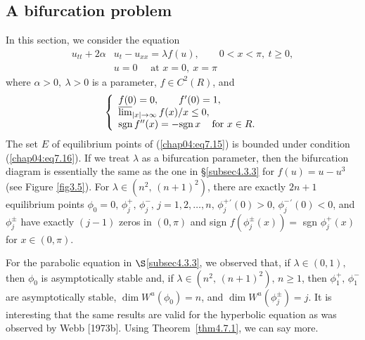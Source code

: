\documentclass{surv-l}
\theoremstyle{plain}
\theoremstyle{definition}
\numberwithin{equation}{section}
\numberwithin{figure}{chapter}
\begin{document}
\subsection{A bifurcation problem}\label{subsec4.7.2} In this section, we consider the equation
\begin{equation}\label{chap04:eq7.15}
\begin{split}
u_{tt}+2\alpha &u_{t}-u_{xx}=\lambda f(u),\qquad 0<x<\pi,\ t\geq 0,\\
&u=0\quad \text{ at } x=0,\ x=\pi
\end{split}
\end{equation}
where $\alpha >0,\ \lambda>0$ is a parameter, $f\in C^{2}(R)$, and
\begin{align}\label{chap04:eq7.16}
\left\{\begin{array}{l}
f(0)=0,\qquad f^{\prime}(0)=1,\\
\varlimsup_{|x|\rightarrow\infty}f(x)/x\leq 0,\\
\mathrm{sgn}\, f^{\prime\prime}(x)= -\mathrm{sgn}\, x\, \quad \mathrm{for}\ x\in R.
\end{array}\right.
\end{align}
The set $E$ of equilibrium points of (\ref{chap04:eq7.15}) is bounded under condition (\ref{chap04:eq7.16}). If we treat $\lambda$ as a bifurcation parameter, then the bifurcation diagram is essentially the same as the one in \S  \ref{subsec4.3.3} for $f(u)=u-u^{3}$ (see Figure \ref{fig3.5}). For $\lambda\in(n^{2},\, (n+1)^{2})$, there are exactly $2n+1$ equilibrium points $\phi_{0}=0,\, \phi_{j}^{+},\, \phi_{j}^{-},\, j=1,2,\ldots, n,\, \phi_{j}^{+}{}^{\prime}(0)>0,\, \phi_{j}^{-}{}^{\prime}(0)<0$, and $\phi_{j}^{\pm}$ have exactly $(j-1)$ zeros in $(0, \pi)$ and sign $f(\phi_{j}^{\pm}(x))=$ sgn $\phi_{j}^{+}(x)$ for $x\in(0, \pi)$.

For the parabolic equation in $\S$\ref{subsec4.3.3}, we observed that, if $\lambda\in(0,1),$ then $\phi_{0}$ is asymptotically stable and, if $\lambda\in(n^{2},\, (n+1)^{2}),\, n\geq 1$, then $\phi_{1}^{+},\, \phi_{1}^{-}$ are asymptotically stable, $\dim W^{u}(\phi_{0})=n$, and $\dim W^{u}(\phi_{j}^{\pm})=j$. It is interesting that the same results are valid for the hyperbolic equation as was observed by Webb [1973b]. Using Theorem~\ref{thm4.7.1}, we can say more.
\end{document}
